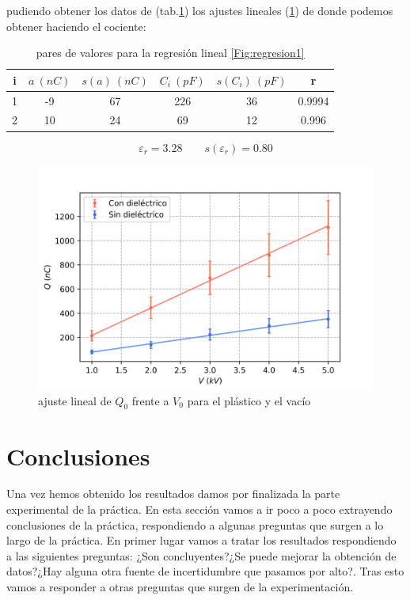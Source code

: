 \documentclass[12pt,a4paper]{article}
\begin{document}
pudiendo obtener los datos de (tab.\ref{tab:regresion3}) los ajustes lineales (\ref{Fig:regresion3}) de donde podemos obtener haciendo el cociente:


\begin{table}[h!] 	 \centering 
\begin{tabular}{|c|c|c|c|c|c|} 
\hline 
i & $a \ (nC)$ & $s(a) \ (nC)$ & $ C_i \ (pF)$ & $s(C_i) \ (pF) $ & r  \\ \hline 
1 & -9  & 67 &  226 & 36 & 0.9994 \\ \hline
2 & 10  & 24 &  69 & 12 & 0.996 \\ 
\hline
\end{tabular} 
\caption{pares de valores  para la regresión lineal \ref{Fig:regresion1}} 
\label{tab:regresion3} 
\end{table} 
 
\begin{equation}
\varepsilon_r = 3.28 \quad \quad s(\varepsilon_r) = 0.80
\end{equation}
 
\begin{figure}[h!] \centering
\includegraphics[scale=1]{plot3.png}
\caption{ajuste lineal de $Q_0$ frente a $V_0$ para el plástico y el vacío}
\label{Fig:regresion3}
\end{figure}
 
 
\section{Conclusiones}


Una vez hemos obtenido los resultados damos por finalizada la parte experimental de la práctica. En esta sección vamos a ir poco a poco extrayendo conclusiones de la práctica, respondiendo a algunas preguntas que surgen a lo largo de la práctica. En primer lugar vamos a tratar los resultados respondiendo a las siguientes preguntas: ¿Son concluyentes?¿Se puede mejorar la obtención de datos?¿Hay alguna otra fuente de incertidumbre que pasamos por alto?. Tras esto vamos a responder a otras preguntas que surgen de la experimentación. \\
\end{document}
